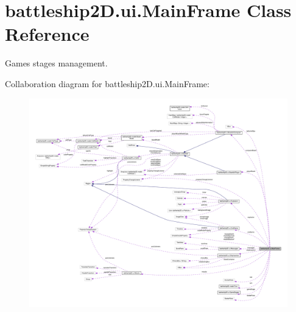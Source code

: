 \hypertarget{classbattleship2D_1_1ui_1_1MainFrame}{\section{battleship2\-D.\-ui.\-Main\-Frame Class Reference}
\label{classbattleship2D_1_1ui_1_1MainFrame}
}


Games stages management.  




Collaboration diagram for battleship2\-D.\-ui.\-Main\-Frame\-:\nopagebreak
\begin{figure}[H]
\begin{center}
\leavevmode
\includegraphics[width=350pt]{classbattleship2D_1_1ui_1_1MainFrame__coll__graph}
\end{center}
\end{figure}
